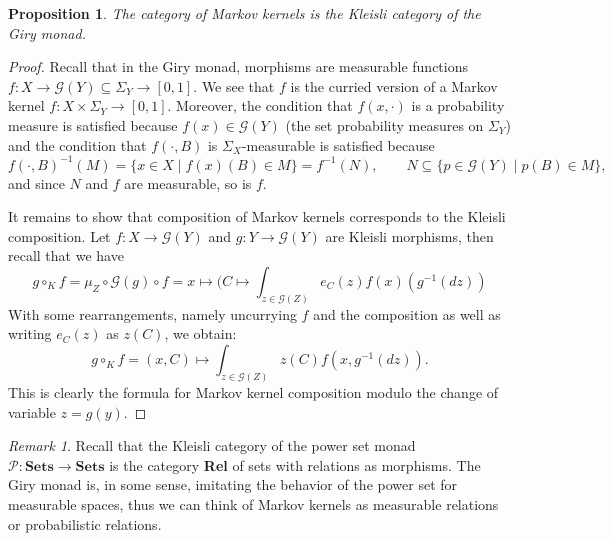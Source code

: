 \documentclass{scrartcl}
\newtheorem{prop}[thm]{Proposition}
\theoremstyle{definition}
\theoremstyle{remark}
\newtheorem{rem}[thm]{Remark}
\newcommand{\mG}{\mathcal{G}}
\newcommand{\mP}{\mathcal{P}}
\begin{document}
\begin{prop}
    The category of Markov kernels is the Kleisli category of the Giry monad.
\end{prop}
\begin{proof}
    Recall that in the Giry monad, morphisms are measurable functions $f:X \rightarrow \mG(Y) \subseteq \Sigma_Y \rightarrow [0,1]$. We see that $f$ is the curried version of a Markov kernel $f: X\times \Sigma_Y \rightarrow [0,1]$. Moreover, the condition that $f(x,\cdot)$ is a probability measure is satisfied because $f(x) \in \mG(Y)$ (the set probability measures on $\Sigma_Y$) and the condition that $f(\cdot, B)$ is $\Sigma_X$-measurable is satisfied because \[f(\cdot,B)^{-1}(M) = \{x \in X \mid f(x)(B) \in M\} = f^{-1}(N), \qquad N \subseteq \{p \in \mG(Y) \mid p(B) \in M\},\]
    and since $N$ and $f$ are measurable, so is $f$.
    
    It remains to show that composition of Markov kernels corresponds to the Kleisli composition. Let $f: X\rightarrow \mG(Y)$ and $g: Y \rightarrow \mG(Y)$ are Kleisli morphisms, then recall that we have
    \[g \circ_K f = \mu_Z \circ \mG(g) \circ f = x \mapsto (C \mapsto \int_{z \in \mG(Z)} e_C(z) f(x)(g^{-1}(dz))\]
    With some rearrangements, namely uncurrying $f$ and the composition as well as writing $e_C(z)$ as $z(C)$, we obtain:
    \[g \circ_K f = (x,C) \mapsto \int_{z \in \mG(Z)} z(C) f(x, g^{-1}(dz)).\]
    This is clearly the formula for Markov kernel composition modulo the change of variable $z = g(y)$.
\end{proof}
\begin{rem}
    Recall that the Kleisli category of the power set monad $\mP: \textbf{Sets} \rightarrow \textbf{Sets}$ is the category \textbf{Rel} of sets with relations as morphisms. The Giry monad is, in some sense, imitating the behavior of the power set for measurable spaces, thus we can think of Markov kernels as measurable relations or probabilistic relations.
\end{rem}
\end{document}

